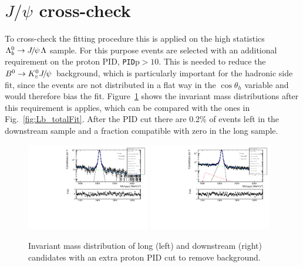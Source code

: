 \section{$J/\psi$ cross-check}

To cross-check the fitting procedure this is applied on the high statistics $\Lb\to\jpsi\Lz$ sample.
For this purpose events are selected with an additional requirement on the proton PID, \verb!PID!p$ > 10$.
This is needed to reduce the $\Bz\to\KS\jpsi$ background, which is particularly important for the hadronic side fit, 
since the \KS events are not distributed in a flat way in the $\cos\theta_h$ variable and would therefore bias the fit.
Figure~\ref{fig:Jpsimass_angular} shows the invariant mass distributions after this requirement is applies, which 
can be compared with the ones in Fig.~\ref{fig:Lb_totalFit}. %
After the PID cut there are 0.2\% of \KS events left in the downstream sample and a fraction
compatible with zero in the long sample.
%
\begin{figure}
\centering
\includegraphics[width=0.48\textwidth]{Lmumu/figs/Jpsi_default_LL_log_fitAndRes.pdf}
\includegraphics[width=0.48\textwidth]{Lmumu/figs/Jpsi_default_DD_log_fitAndRes.pdf}
\caption{Invariant mass distribution of \Lb\ra\jpsi\Lz long (left) and downstream (right)
candidates with an extra proton PID cut to remove \KS background. }
\label{fig:Jpsimass_angular}
\end{figure}
%
